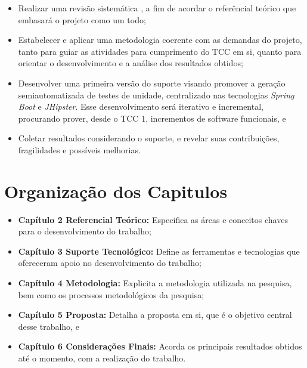 \begin{itemize}
    \item Realizar uma revisão sistemática , a fim de acordar o referêncial teórico que embasará o projeto como um todo;
    \item Estabelecer e aplicar uma metodologia coerente com as demandas do projeto, tanto para guiar as atividades para cumprimento do TCC em si, quanto para orientar o desenvolvimento e a análise dos resultados obtidos;
    \item Desenvolver uma primeira versão do suporte visando promover a geração semiautomatizada de testes de unidade, centralizado nas tecnologias \textit{Spring Boot} e \textit{JHipster}. Esse desenvolvimento será iterativo e incremental, procurando prover, desde o TCC 1,  incrementos de software funcionais, e 
    \item Coletar resultados considerando o suporte, e revelar suas contribuições, fragilidades e possíveis melhorias. 
    
\end{itemize} 

\section[OrgCapt]{Organização dos Capitulos}
\label{organizacao_capitulos}

\begin{itemize}
    \item \textbf{Capítulo 2 Referencial Teórico:} Especifica as áreas e conceitos chaves para o desenvolvimento do trabalho;
    \item \textbf{Capítulo 3 Suporte Tecnológico:} Define as ferramentas e tecnologias que ofereceram apoio no desenvolvimento do trabalho;
    \item \textbf{Capítulo 4 Metodologia:} Explicita a metodologia utilizada na pesquisa, bem como os processos metodológicos da pesquisa;
    \item \textbf{Capítulo 5 Proposta:} Detalha a proposta em si, que é o objetivo central desse trabalho, e
    \item \textbf{Capítulo 6 Considerações Finais:} Acorda os principais resultados obtidos até o momento, com a realização do trabalho.
\end{itemize} 
